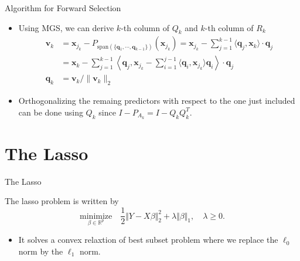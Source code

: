 \documentclass[blue, 10pt]{beamer}
\begin{document}
\begin{frame}{Algorithm for Forward Selection}

\begin{itemize}
  \item Using MGS, we can derive $k$-th column of $Q_k$ and $k$-th column of $R_k$
  \begin{align*}
    \mathbf{v}_k &= \mathbf{x}_{j_k} - P_{\text{span}(\{\mathbf{q}_1,\cdots,\mathbf{q}_{k-1}\})}(\mathbf{x}_{j_k}) = \mathbf{x}_{j_k} -  \sum_{j=1}^{k-1} \langle \mathbf{q}_j, \mathbf{x}_k \rangle \cdot \mathbf{q}_j \\
      &=  \mathbf{x}_k -  \sum_{j=1}^{k-1} \left\langle \mathbf{q}_j, \mathbf{x}_{j_k} - \sum_{i=1}^{j-1}\langle \mathbf{q}_i, \mathbf{x}_{j_k} \rangle \mathbf{q}_i \right\rangle \cdot \mathbf{q}_j \\
    \mathbf{q}_k &= \mathbf{v}_k / \|\mathbf{v}_k\|_2
  \end{align*}
  \item Orthogonalizing the remaing predictors with respect to the one just included can be done using $Q_k$ since $I-P_{A_k} = I - Q_k Q_k^T$.
\end{itemize}

\end{frame}


\section{The Lasso}

\begin{frame}{The Lasso}

  The lasso problem is written by
  $$\underset{\beta \in \mathbb{R}^p}{\text{minimize}} \quad \frac 12\Vert Y - X \beta \Vert_2^2 + \lambda \Vert \beta \Vert_1, \quad \lambda \ge 0.$$
  \begin{itemize}
    \item It solves a convex relaxtion of best subset problem where we replace the $\ell_0$ norm by the $\ell_1$ norm. 
  \end{itemize}
 
\end{frame}
\end{document}
